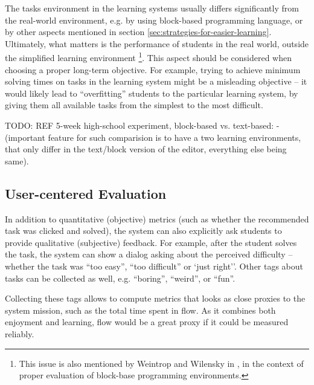 
The tasks environment in the learning systems usually differs significantly
  from the real-world environment,
  e.g. by using block-based programming language,
  or by other aspects mentioned in section \ref{sec:strategies-for-easier-learning}.
Ultimately, what matters is the performance of students in the real world,
  outside the simplified learning environment%
\footnote{%
  This issue is also mentioned by Weintrop and Wilensky %
  in \cite{challenges-of-blocks-based-environments}, %
  in the context of proper evaluation of block-base programming environments.}.
This aspect should be considered when choosing a proper long-term objective.
For example, trying to achieve minimum solving times on tasks in the learning system
  might be a misleading objective
  -- it would likely lead to ``overfitting'' students to the particular learning system,
  by giving them all available tasks from the simplest to the most difficult.

TODO: REF 5-week high-school experiment, block-based vs. text-based:
- \cite{comparing-blocks-text-weintrop2017}
(important feature for such comparision is to have a two learning environments,
that only differ in the text/block version of the editor, everything else being same).


\subsection{User-centered Evaluation}

In addition to quantitative (objective) metrics (such as whether the
recommended task was clicked and solved), the system can also explicitly ask
students to provide qualitative (subjective) feedback.
For example, after the student solves the task, the system can show a dialog
asking about the perceived difficulty -- whether the task was ``too
easy'', ``too difficult'' or `just right''.
Other tags about tasks can be collected as well, e.g. ``boring'', ``weird'', or ``fun''.

Collecting these tags allows to compute metrics that looks as close proxies to
the system mission, such as the total time spent in flow.
As it combines both enjoyment and learning,
flow would be a great proxy if it could be measured reliably.

